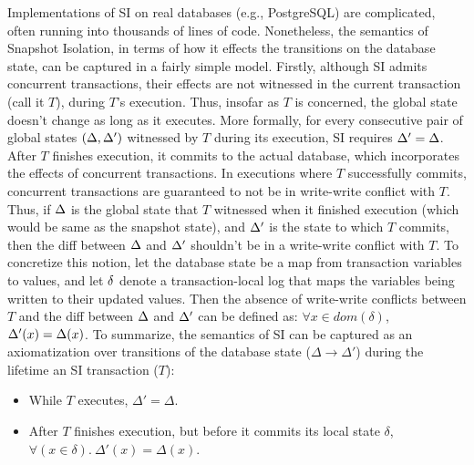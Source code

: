 Implementations of SI on real databases (e.g., PostgreSQL) are
complicated, often running into thousands of lines of code.
Nonetheless, the semantics of Snapshot Isolation, in terms of how it
effects the transitions on the database state, can be captured in a
fairly simple model. Firstly, although SI admits concurrent
transactions, their effects are  not witnessed in the current
transaction (call it $T$), during $T$'s execution. Thus, insofar as
$T$ is concerned, the global state doesn't change as long as it
executes. More formally, for every consecutive pair of global states
$(\Delta,\Delta')$ witnessed by $T$ during its execution, SI requires
$\Delta'=\Delta$.  After $T$ finishes execution, it commits to the actual
database, which incorporates the effects of concurrent transactions.
In executions where $T$ successfully commits, concurrent transactions
are guaranteed to not be in write-write conflict with $T$. Thus, if
$\Delta$ is the global state that $T$ witnessed when it finished
execution (which would be same as the snapshot state), and $\Delta'$ is
the state to which $T$ commits, then the diff between $\Delta$ and
$\Delta'$ shouldn't be in a write-write conflict with $T$. To concretize
this notion, let the database state be a map from transaction
variables to values, and let $\delta$ denote a transaction-local log
that maps the variables being written to their updated values. Then
the absence of write-write conflicts between $T$ and the diff between
$\Delta$ and $\Delta'$ can be defined as: $\forall
x\in\mathit{dom}(\delta)$, $\Delta'(x) = \Delta(x)$.  To summarize, the
semantics of SI can be captured as an axiomatization over transitions
of the database state ($\Delta \longrightarrow \Delta'$) during the
lifetime an SI transaction ($T$):
\begin{itemize}
  \item While $T$ executes, $\Delta' = \Delta$.
  \item After $T$ finishes execution, but before it commits its local
    state $\delta$, $\forall(x\in\delta).~\Delta'(x) = \Delta(x)$.
\end{itemize}

